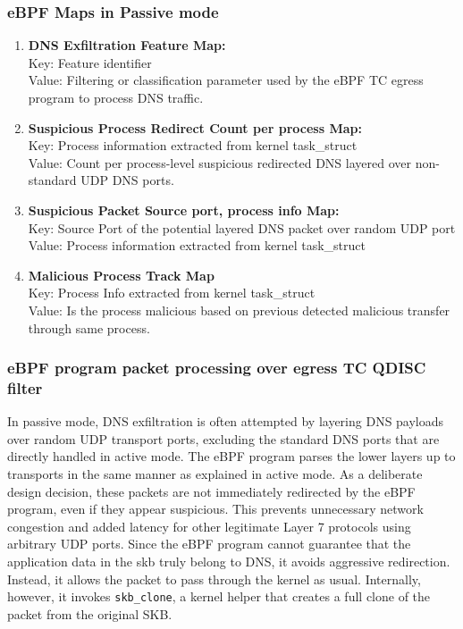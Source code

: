 \documentclass [11pt, proquest] {uwthesis}[2020/02/24]
\begin{document}
\subsubsection{\textbf{eBPF Maps in Passive mode}}
\begin{enumerate}[itemsep=1pt,parsep=0pt]
\label{passive:maps}
\item \textbf{DNS Exfiltration Feature Map:} \\
Key: Feature identifier \\
Value: Filtering or classification parameter used by the eBPF TC egress program to process DNS traffic.

\item \textbf{Suspicious Process Redirect Count per process Map:} \\
Key: Process information extracted from kernel task\_struct \\
Value: Count per process-level suspicious redirected DNS layered over non-standard UDP DNS ports.

\item \textbf{Suspicious Packet Source port, process info Map:} \\
Key: Source Port of the potential layered DNS packet over random UDP port \\
Value: Process information extracted from kernel task\_struct 


\item \textbf{Malicious Process Track Map} \\
Key: Process Info extracted from kernel task\_struct \\
Value: Is the process malicious based on previous detected malicious transfer through same process.
\end{enumerate}





\subsubsection{\textbf{eBPF program packet processing over egress TC QDISC filter}}
\label{passive:sec1}
In passive mode, DNS exfiltration is often attempted by layering DNS payloads over random UDP transport ports, excluding the standard DNS ports that are directly handled in active mode. The eBPF program parses the lower layers up to transports in the same manner as explained in active mode. As a deliberate design decision, these packets are not immediately redirected by the eBPF program, even if they appear suspicious. This prevents unnecessary network congestion and added latency for other legitimate Layer 7 protocols using arbitrary UDP ports. Since the eBPF program cannot guarantee that the application data in the skb truly belong to DNS, it avoids aggressive redirection. Instead, it allows the packet to pass through the kernel as usual. Internally, however, it invokes \texttt{skb\_clone}, a kernel helper that creates a full clone of the packet from the original SKB.
\end{document}
